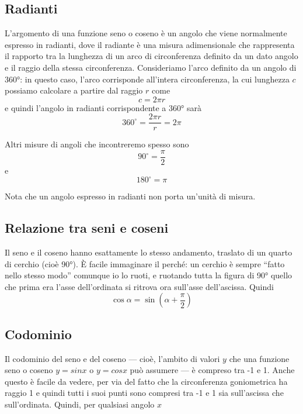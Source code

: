 \documentclass[11pt]{report}
\begin{document}
\subsection{Radianti}

L'argomento di una funzione seno o coseno è un angolo che viene normalmente espresso in radianti, dove il radiante è una misura adimensionale che rappresenta il rapporto tra la lunghezza di un arco di circonferenza definito da un dato angolo e il raggio della stessa circonferenza. Consideriamo l'arco definito da un angolo di 360°: in questo caso, l'arco corrisponde all'intera circonferenza, la cui lunghezza $c$ possiamo calcolare a partire dal raggio $r$ come
\begin{equation}
c = 2 \pi r
\end{equation}
e quindi l'angolo in radianti corrispondente a 360° sarà
\begin{equation}
360^{\circ} = \frac{2 \pi r}{r} = 2 \pi
\end{equation}

Altri misure di angoli che incontreremo spesso sono
\begin{equation}
90^{\circ} = \frac{\pi}{2}
\end{equation}
e
\begin{equation}
180^{\circ} = \pi
\end{equation}

Nota che un angolo espresso in radianti non porta un'unità di misura.


\subsection{Relazione tra seni e coseni}

Il seno e il coseno hanno esattamente lo stesso andamento, traslato di un quarto di cerchio (cioè 90°). È facile immaginare il perché: un cerchio è sempre ``fatto nello stesso modo'' comunque io lo ruoti, e ruotando tutta la figura di 90° quello che prima era l'asse dell'ordinata si ritrova ora sull'asse dell'ascissa. Quindi
\begin{equation}
\cos \alpha = \sin(\alpha + \frac{\pi}{2})
\end{equation}


\subsection{Codominio}

Il codominio del seno e del coseno --- cioè, l'ambito di valori $y$ che una funzione seno o coseno $y = sin x$ o $y = cos x$ può assumere --- è compreso tra -1 e 1. Anche questo è facile da vedere, per via del fatto che la circonferenza goniometrica ha raggio 1 e quindi tutti i suoi punti sono compresi tra -1 e 1 sia sull'ascissa che sull'ordinata. Quindi, per qualsiasi angolo $x$
\end{document}
